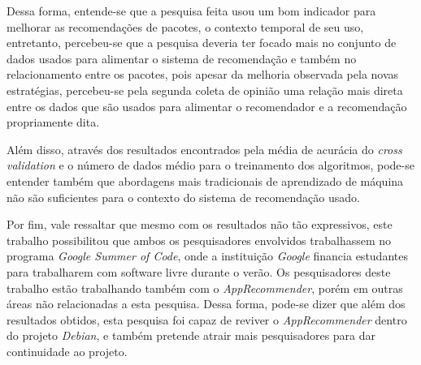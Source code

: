 Dessa forma, entende-se que a pesquisa feita usou um bom indicador para melhorar as
recomendações de pacotes, o contexto temporal de seu uso, entretanto,
percebeu-se que a pesquisa deveria ter focado mais no conjunto de dados usados
para alimentar o sistema de recomendação e também no relacionamento entre os
pacotes, pois apesar da melhoria observada pela novas estratégias, percebeu-se
pela segunda coleta de opinião uma relação mais direta entre os dados que são
usados para alimentar o recomendador e a recomendação propriamente dita.

Além disso, através dos resultados encontrados pela média de acurácia do
\textit{cross validation} e o número de dados médio para o treinamento dos
algoritmos, pode-se entender também que abordagens mais tradicionais de
aprendizado de máquina não são suficientes para o contexto do sistema de
recomendação usado.

Por fim, vale ressaltar que mesmo com os resultados não tão expressivos, este
trabalho possibilitou que ambos os pesquisadores envolvidos trabalhassem no
programa \textit{Google Summer of Code}, onde a instituição \textit{Google}
financia estudantes para trabalharem com software livre durante o verão. Os
pesquisadores deste trabalho estão trabalhando também com o
\textit{AppRecommender}, porém em outras áreas não relacionadas a esta pesquisa.
Dessa forma, pode-se dizer que além dos resultados obtidos, esta pesquisa foi
capaz de reviver o \textit{AppRecommender} dentro do projeto \textit{Debian},
e também pretende atrair mais pesquisadores para dar continuidade ao projeto.
